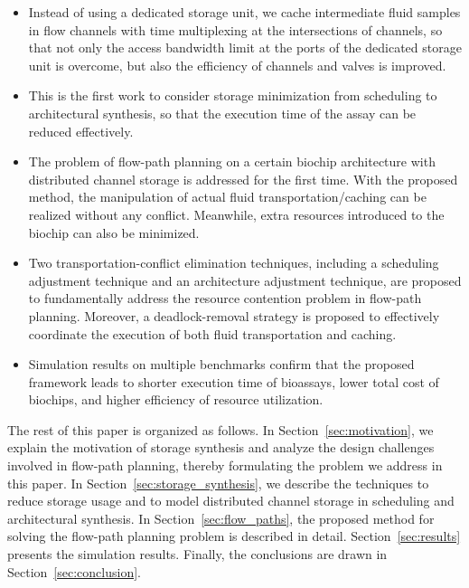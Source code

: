 \begin{itemize}%
\item Instead of using a dedicated storage unit, we cache intermediate fluid samples in flow channels with time multiplexing at the intersections of channels, so that not only the access bandwidth limit at the ports of the dedicated storage unit is overcome, but also the efficiency of channels and valves is improved.

\item This is the first work to consider storage minimization from scheduling to architectural synthesis, so that the execution time of the assay can be reduced effectively.

\item The problem of flow-path planning on a certain biochip architecture with distributed channel storage is addressed for the first time. With the proposed method, the manipulation of actual fluid transportation/caching can be realized without any conflict. Meanwhile, extra resources introduced to the biochip can also be minimized.

\item Two transportation-conflict elimination techniques, including a scheduling adjustment technique and an architecture adjustment technique, are proposed to fundamentally address the resource contention problem in flow-path planning. Moreover, a deadlock-removal strategy is proposed to effectively coordinate the execution of both fluid transportation and caching.

\item Simulation results on multiple benchmarks confirm that the proposed framework leads to shorter execution time of bioassays, lower total cost of biochips, and higher efficiency of resource utilization.



\end{itemize}


The rest of this paper is organized as follows. In
Section~\ref{sec:motivation}, we explain the motivation of storage synthesis and analyze the design challenges involved in flow-path planning, thereby formulating the problem we address in this paper. In Section~\ref{sec:storage_synthesis}, we
describe the techniques to reduce storage usage and to model
distributed channel storage in scheduling and architectural synthesis. In Section~\ref{sec:flow_paths},
the proposed method for solving the flow-path planning problem is described in detail. Section~\ref{sec:results} presents the simulation results.
Finally, the conclusions are drawn in Section~\ref{sec:conclusion}.

